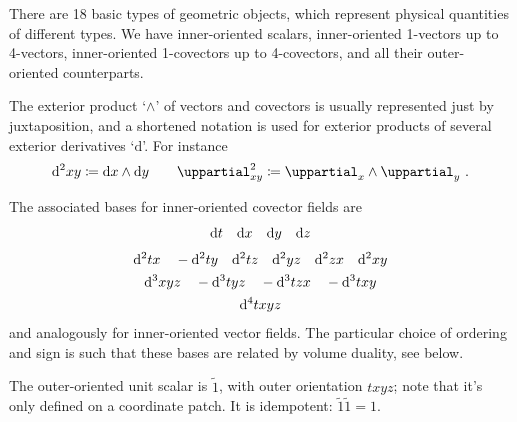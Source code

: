 \documentclass[\ifafour a4paper,12pt,\else a5paper,10pt,\fi%
onecolumn,oneside,article,%
british%
]{memoir}
\theoremstyle{remark}
\theoremstyle{innote}
\newcommand*{\de}{\uppartial}%
\newcommand*{\di}{\mathrm{d}}%
\newcommand*{\defd}{\coloneqq}
\renewcommand*{\|}[1][]{\nonscript\:#1\vert\nonscript\:\mathopen{}}
\newcommand*{\si}[1]{\di{#1}}
\newcommand*{\ssi}[1]{\di^{2}{#1}}
\newcommand*{\sssi}[1]{\di^{3}{#1}}
\newcommand*{\ssssi}[1]{\di^{4}{#1}}
\newcommand*{\tw}[1]{\tilde{#1}}
\begin{document}
There are 18 basic types of geometric objects, which represent physical quantities of different types. We have inner-oriented scalars, inner-oriented 1-vectors up to 4-vectors, inner-oriented 1-covectors up to 4-covectors, and all their outer-oriented counterparts.

The exterior product \enquote*{$\land$} of vectors and covectors is usually represented just by juxtaposition, and a shortened notation is used for exterior products of several exterior derivatives \enquote*{$\di$}. For instance
\begin{equation}
  \label{eq:notation_dwedge}
  \di^{2}xy \defd \di x \land \di y
  \qquad
  \de^{2}_{xy} \defd \de_{x} \land \de_{y} \ .
\end{equation}

The associated bases for inner-oriented covector fields are
\begin{gather}
  \label{eq:basis_1vec}
  \si{t}\quad
  \si{x}\quad
  \si{y}\quad
  \si{z}
  \\[\jot]
  \label{eq:basis_2vec}
  \ssi{tx}\quad
  -\ssi{ty}\quad
  \ssi{tz}\quad
  \ssi{yz}\quad
  \ssi{zx}\quad
  \ssi{xy}
  \\
  \label{eq:basis_3vec}
  \sssi{xyz}\quad
  -\sssi{tyz}\quad
  -\sssi{tzx}\quad
  -\sssi{txy}
  \\
  \label{eq:basis_4vec}
  \ssssi{txyz}
\end{gather}
and analogously for inner-oriented vector fields. The particular choice of ordering and sign is such that these bases are related by volume duality, see below.

The outer-oriented unit scalar is $\tw{1}$, with outer orientation $txyz$; note that it's only defined on a coordinate patch. It is idempotent: $\tw{1}\tw{1} =1$.
\end{document}
